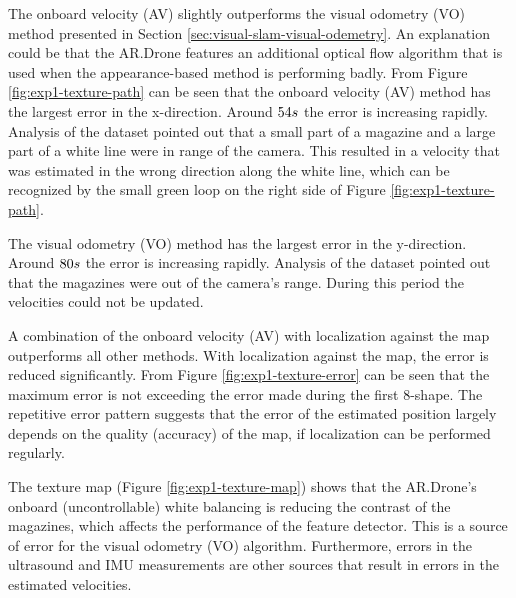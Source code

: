The onboard velocity (AV) slightly outperforms the visual odometry (VO) method presented in Section \ref{sec:visual-slam-visual-odemetry}.
An explanation could be that the AR.Drone features an additional optical flow algorithm that is used when the appearance-based method is performing badly.
From Figure \ref{fig:exp1-texture-path} can be seen that the onboard velocity (AV) method has the largest error in the x-direction.
Around $54\begin{small}s\end{small}$ the error is increasing rapidly.
Analysis of the dataset pointed out that a small part of a magazine and a large part of a white line were in range of the camera.
This resulted in a velocity that was estimated in the wrong direction along the white line, which can be recognized by the small green loop on the right side of Figure \ref{fig:exp1-texture-path}.

The visual odometry (VO) method has the largest error in the y-direction.
Around $80\begin{small}s\end{small}$ the error is increasing rapidly.
Analysis of the dataset pointed out that the magazines were out of the camera's range. During this period the velocities could not be updated.

A combination of the onboard velocity (AV) with localization against the map outperforms all other methods.
With localization against the map, the error is reduced significantly.
From Figure \ref{fig:exp1-texture-error} can be seen that the maximum error is not exceeding the error made during the first 8-shape.
The repetitive error pattern suggests that the error of the estimated position largely depends on the quality (accuracy) of the map, if localization can be performed regularly.

The texture map (Figure \ref{fig:exp1-texture-map}) shows that the AR.Drone's onboard (uncontrollable) white balancing is reducing the contrast of the magazines, which affects the performance of the feature detector.
This is a source of error for the visual odometry (VO) algorithm.
Furthermore, errors in the ultrasound and IMU measurements are other sources that result in errors in the estimated velocities.

